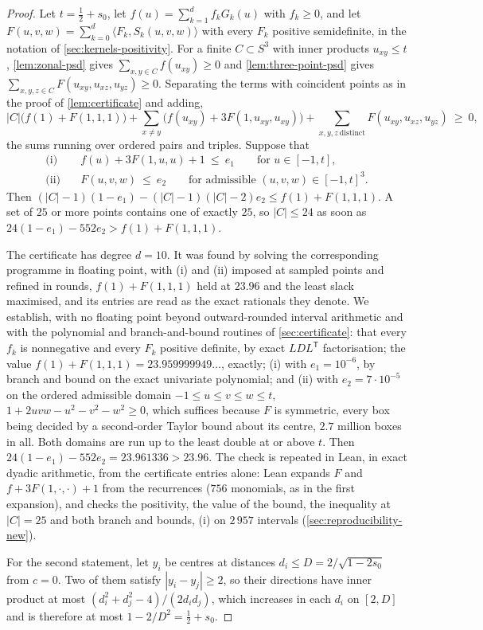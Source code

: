 \documentclass[11pt,reqno]{amsart}
\renewcommand{\_}{\origunderscore\allowbreak}
\numberwithin{equation}{section}
\theoremstyle{plain}
\theoremstyle{definition}
\theoremstyle{remark}
\begin{document}
\begin{proof}
Let $t=\tfrac12+s_0$, let $f(u)=\sum_{k=1}^{d}f_kG_k(u)$ with $f_k\ge0$, and
let $F(u,v,w)=\sum_{k=0}^{d}\langle F_k,S_k(u,v,w)\rangle$ with every $F_k$
positive semidefinite, in the notation of \cref{sec:kernels-positivity}. For a
finite $C\subset S^3$ with inner products $u_{xy}\le t$, \cref{lem:zonal-psd}
gives $\sum_{x,y\in C}f(u_{xy})\ge0$ and \cref{lem:three-point-psd} gives
$\sum_{x,y,z\in C}F(u_{xy},u_{xz},u_{yz})\ge0$. Separating the terms with
coincident points as in the proof of \cref{lem:certificate} and adding,
\[
  |C|\bigl(f(1)+F(1,1,1)\bigr)
  +\sum_{x\ne y}\bigl(f(u_{xy})+3F(1,u_{xy},u_{xy})\bigr)
  +\sum_{x,y,z\ \text{distinct}}F(u_{xy},u_{xz},u_{yz})\ \ge\ 0 ,
\]
the sums running over ordered pairs and triples. Suppose that
\begin{align*}
  \text{(i)}\quad& f(u)+3F(1,u,u)+1\ \le\ e_1
  \qquad\text{for } u\in[-1,t],\\
  \text{(ii)}\quad& F(u,v,w)\ \le\ e_2
  \qquad\text{for admissible } (u,v,w)\in[-1,t]^3 .
\end{align*}
Then $(|C|-1)(1-e_1)-(|C|-1)(|C|-2)e_2\le f(1)+F(1,1,1)$. A set of $25$ or
more points contains one of exactly $25$, so $|C|\le24$ as soon as
$24(1-e_1)-552e_2>f(1)+F(1,1,1)$.

The certificate has degree $d=10$. It was found by solving the
corresponding programme in floating point, with (i) and (ii) imposed at
sampled points and refined in rounds, $f(1)+F(1,1,1)$ held at $23.96$ and
the least slack maximised, and its entries are read as the exact
rationals they denote. We establish, with no floating point beyond
outward-rounded interval arithmetic and with the polynomial and
branch-and-bound routines of \cref{sec:certificate}: that every $f_k$
is nonnegative and every $F_k$ positive definite, by exact
$LDL^{\mathsf T}$ factorisation; the value $f(1)+F(1,1,1)=23.959999949\ldots$,
exactly; (i) with $e_1=10^{-6}$, by branch and bound on the exact univariate
polynomial; and (ii) with $e_2=7\cdot10^{-5}$ on the ordered admissible domain
$-1\le u\le v\le w\le t$, $1+2uvw-u^2-v^2-w^2\ge0$, which suffices because
$F$ is symmetric, every box being decided by a second-order Taylor bound
about its centre, $2.7$ million boxes in all. Both domains are run up to the
least double at or above $t$. Then $24(1-e_1)-552e_2=23.961336>23.96$.
The check is repeated in Lean, in exact dyadic arithmetic, from the
certificate entries alone: Lean expands $F$ and $f+3F(1,\cdot,\cdot)+1$
from the recurrences ($756$ monomials, as in the first expansion), and
checks the positivity, the value of the bound, the inequality at
$|C|=25$ and both branch and bounds, (i) on $2\,957$ intervals
(\cref{sec:reproducibility-new}).

For the second statement, let $y_i$ be centres at distances
$d_i\le D=2/\sqrt{1-2s_0}$ from $c=0$. Two of them satisfy
$|y_i-y_j|\ge2$, so their directions have inner product at most
$(d_i^2+d_j^2-4)/(2d_id_j)$, which increases in each $d_i$ on $[2,D]$ and is
therefore at most $1-2/D^2=\tfrac12+s_0$.
\end{proof}
\end{document}
